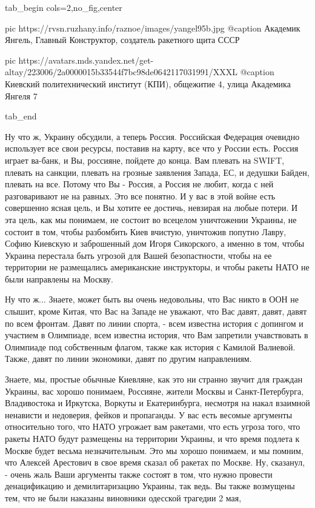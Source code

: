 \ifcmt
  tab_begin cols=2,no_fig,center

     pic https://rvsn.ruzhany.info/raznoe/images/yangel95b.jpg
		 @caption Академик Янгель, Главный Конструктор, создатель ракетного щита СССР

		 pic https://avatars.mds.yandex.net/get-altay/223006/2a0000015b33544f7bc98de0642117031991/XXXL
		 @caption Киевский политехнический институт (КПИ), общежитие 4, улица Академика Янгеля 7

  tab_end
\fi

Ну что ж, Украину обсудили, а теперь Россия. Российская Федерация очевидно
использует все свои ресурсы, поставив на карту, все что у России есть. Россия
играет ва-банк, и Вы, россияне, пойдете до конца. Вам плевать на SWIFT, плевать
на санкции, плевать на грозные заявления Запада, ЕС, и дедушки Байден, плевать
на все. Потому что Вы - Россия, а Россия не любит, когда с ней разговаривают не
на равных. Это все понятно. И у вас в этой войне есть  совершенно ясная цель, и
Вы хотите ее достичь, невзирая на любые потери. И эта цель, как мы понимаем, не
состоит во всецелом уничтожении Украины, не состоит в том, чтобы разбомбить
Киев вчистую, уничтожив попутно Лавру, Софию Киевскую и заброшенный дом Игоря
Сикорского, а именно в том, чтобы Украина перестала быть угрозой для Вашей
безопастности, чтобы на ее территории не размещались американские инструкторы,
и чтобы ракеты НАТО не были направлены на Москву. 

Ну что ж... Знаете, может быть вы очень недовольны, что Вас никто в ООН не
слышит, кроме Китая, что Вас на Западе не уважают, что Вас давят, давят, давят
по всем фронтам. Давят по линии спорта, - всем известна история с допингом и
участием в Олимпиаде, всем известна история, что Вам запретили учавствовать в
Олимпиаде под собственным флагом,  также как история с Камилой Валиевой. Также,
давят по линии экономики, давят по другим направлениям.

Знаете, мы, простые обычные Киевляне, как это ни странно звучит для граждан
Украины, вас хорошо понимаем, Россияне, жители Москвы и Санкт-Петербурга,
Владивостока и Иркутска, Воркуты и Екатеринбурга, несмотря на накал взаимной
ненависти и недоверия, фейков и пропаганды. У вас есть весомые аргументы
относительно того, что НАТО угрожает вам ракетами, что есть угроза того, что
ракеты НАТО будут размещены на территории Украины, и что время подлета к Москве
будет весьма незначительным.  Это мы хорошо понимаем, и мы помним, что Алексей
Арестович в свое время сказал об ракетах по Москве. Ну, сказанул, - очень жаль
Ваши аргументы также состоят в том, что нужно провести денацификацию и
демилитаризацию Украины, так ведь. Вы также возмущены тем, что не были наказаны
виновники одесской трагедии 2 мая, 
